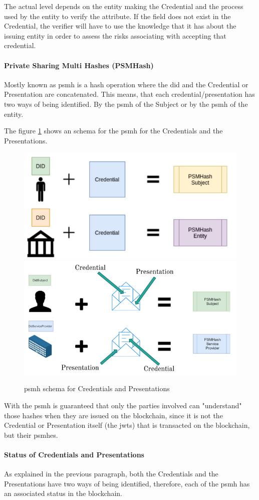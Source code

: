 The actual level depends on the entity making the Credential and the process used by the entity to verify the attribute. If the field does not exist in the Credential, the verifier will have to use the knowledge that it has about the issuing entity in order to assess the risks associating with accepting that credential.

\paragraph{Private Sharing Multi Hashes (PSMHash)}
Mostly known as \acrshort{psmh} is a hash operation where the \acrshort{did} and the Credential or Presentation are concatenated. This means, that each credential/presentation has two ways of being identified. By the \acrshort{psmh} of the Subject or by the \acrshort{psmh} of the entity.

The figure \ref{fig:psmh} shows an schema for the \acrshort{psmh} for the Credentials and the Presentations.
\begin{figure}[h]
    \centering
    \includegraphics[width=.5\textwidth]{images/Alastria ID/psmhash-credential.png}\hfill
    \includegraphics[width=.5\textwidth]{images/Alastria ID/psmhash-presentation.png}
    \caption{\acrshort{psmh} schema for Credentials and Presentations}
    \label{fig:psmh}
\end{figure}

With the \acrshort{psmh} is guaranteed that only the parties involved can "understand" those hashes when they are issued on the blockchain, since it is not the Credential or Presentation itself (the \acrshort{jwt}s) that is transacted on the blockchain, but their \acrshort{psmh}es.

\paragraph{Status of Credentials and Presentations}
As explained in the previous paragraph, both the Credentials and the Presentations have two ways of being identified, therefore, each of the \acrshort{psmh} has an associated status in the blockchain.

